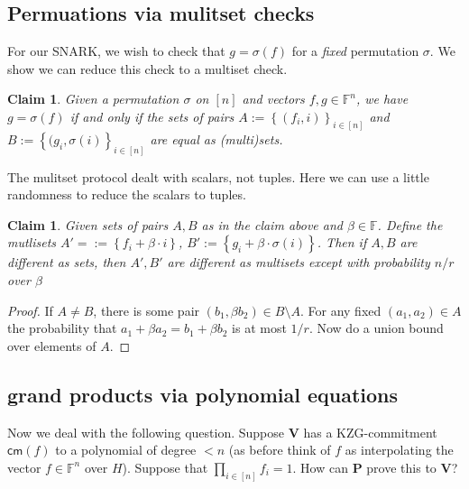 \documentclass[11pt]{article} %
\newcommand{\F}{\ensuremath{\mathbb F}\xspace}
\newcommand{\cm}{\ensuremath{\mathsf{cm}}\xspace}
\newcommand{\defeq}{:=}
\newcommand{\prv}{\ensuremath{\mathsf{\mathbf{P}}}\xspace}
\newcommand{\ver}{\ensuremath{\mathsf{\mathbf{V}}}\xspace}
\newcommand{\set}[1]{\ensuremath{\left\{#1\right\}}\xspace}
\newtheorem{claim}[lemma]{Claim}
\begin{document}
\subsection{Permuations via mulitset checks}
For our SNARK, we wish to check that $g=\sigma(f)$ for a \emph{fixed} permutation $\sigma$.
We show we can reduce this check to a multiset check.
\begin{claim}
 Given a permutation $\sigma$ on $[n]$ and vectors $f,g\in \F^n$, we have $g=\sigma(f)$ if and only if
 the sets of pairs $A\defeq \set{(f_i,i)}_{i\in [n]}$ and $B\defeq \set{(g_{i},\sigma(i)}_{i\in [n]}$
 are equal as (multi)sets.
\end{claim}

The mulitset protocol dealt with scalars, not tuples.
Here we can use a little randomness to reduce the scalars to tuples.
\begin{claim}
 Given sets of pairs $A,B$ as in the claim above and $\beta \in \F$.
 Define the mutlisets $A'=\defeq \set{f_i+\beta \cdot i}$, $B'\defeq \set{g_i + \beta \cdot \sigma(i)}$.
 Then if $A,B$ are different as sets, then $A',B'$ are different as multisets except with probability $n/r$ over $\beta$
\end{claim}
\begin{proof}
If $A\neq B$, there is some pair $(b_1,\beta b_2)\in B\setminus A$.
For any fixed $(a_1,a_2)\in A$ the probability that $a_1+\beta a_2= b_1+\beta b_2$ is at most $1/r$.
Now do a union bound over elements of $A$.
\end{proof}


\subsection{grand products via polynomial equations}
Now we deal with the following question. Suppose \ver has a KZG-commitment $\cm(f)$ to a polynomial of degree $<n$ (as before 
think of $f$ as interpolating the vector $f\in \F^n$ over $H$).
Suppose that $\prod_{i\in [n]} f_i =1$.  How can \prv prove this to \ver?
\end{document}
